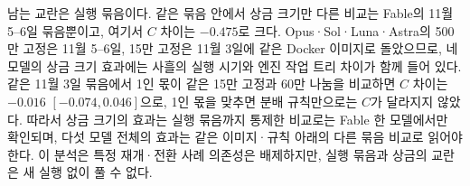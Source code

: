 남는 교란은 실행 묶음이다. 같은 묶음 안에서 상금 크기만 다른 비교는 Fable의 11월 5--6일 묶음뿐이고, 여기서 $C$ 차이는 $-0.475$로 크다. Opus·Sol·Luna·Astra의 500만 고정은 11월 5--6일, 15만 고정은 11월 3일에 같은 Docker 이미지로 돌았으므로, 네 모델의 상금 크기 효과에는 사흘의 실행 시기와 엔진 작업 트리 차이가 함께 들어 있다. 같은 11월 3일 묶음에서 1인 몫이 같은 15만 고정과 60만 나눔을 비교하면 $C$ 차이는 $-0.016$ $[-0.074, 0.046]$으로, 1인 몫을 맞추면 분배 규칙만으로는 $C$가 달라지지 않았다. 따라서 상금 크기의 효과는 실행 묶음까지 통제한 비교로는 Fable 한 모델에서만 확인되며, 다섯 모델 전체의 효과는 같은 이미지·규칙 아래의 다른 묶음 비교로 읽어야 한다. 이 분석은 특정 재개·전환 사례 의존성은 배제하지만, 실행 묶음과 상금의 교란은 새 실행 없이 풀 수 없다.
